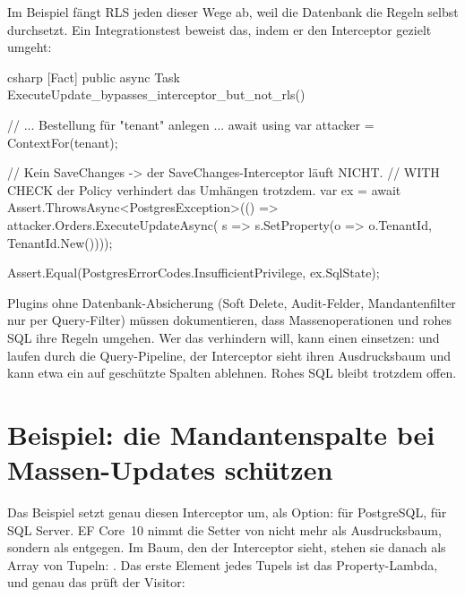 Im Beispiel fängt RLS jeden dieser Wege ab, weil die Datenbank die Regeln selbst durchsetzt.
Ein Integrationstest beweist das, indem er den Interceptor gezielt umgeht:

\begin{sourcecode}{csharp}
[Fact]
public async Task ExecuteUpdate_bypasses_interceptor_but_not_rls()
{
    // ... Bestellung für "tenant" anlegen ...
    await using var attacker = ContextFor(tenant);

    // Kein SaveChanges -> der SaveChanges-Interceptor läuft NICHT.
    // WITH CHECK der Policy verhindert das Umhängen trotzdem.
    var ex = await Assert.ThrowsAsync<PostgresException>(() =>
        attacker.Orders.ExecuteUpdateAsync(
            s => s.SetProperty(o => o.TenantId, TenantId.New())));

    Assert.Equal(PostgresErrorCodes.InsufficientPrivilege, ex.SqlState);
}
\end{sourcecode}

\begin{important}
  Plugins ohne Datenbank-Absicherung (Soft Delete, Audit-Felder, Mandantenfilter nur per
  Query-Filter) müssen dokumentieren, dass Massenoperationen und rohes SQL ihre Regeln
  umgehen. Wer das verhindern will, kann einen
   einsetzen:
   und  laufen durch die
  Query-Pipeline, der Interceptor sieht ihren Ausdrucksbaum und kann etwa ein
   auf geschützte Spalten ablehnen. Rohes SQL bleibt trotzdem
  offen.
\end{important}

\section{Beispiel: die Mandantenspalte bei Massen-Updates schützen}

Das Beispiel setzt genau diesen Interceptor um, als Option:
für PostgreSQL,  für SQL
Server. EF Core~10 nimmt die Setter von  nicht mehr als
Ausdrucksbaum, sondern als 
entgegen. Im Baum, den der Interceptor sieht, stehen sie danach als Array von Tupeln:
.
Das erste Element jedes Tupels ist das Property-Lambda, und genau das prüft der Visitor:

